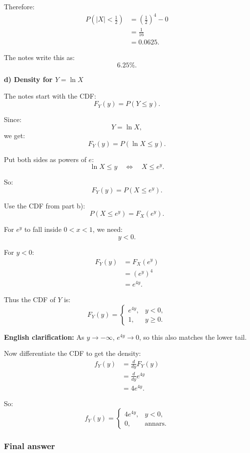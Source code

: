 \documentclass[10pt]{article}
\begin{document}
Therefore:
\begin{align*}
P(|X|<\tfrac12)
&=
\left(\frac12\right)^4-0
\\[2mm]
&=
\frac{1}{16}
\\[2mm]
&=
0.0625.
\end{align*}

The notes write this as:
\[
6.25\%.
\]

\textbf{d) Density for \(Y=\ln X\)}

The notes start with the CDF:
\[
F_Y(y)=P(Y\le y).
\]

Since:
\[
Y=\ln X,
\]
we get:
\[
F_Y(y)=P(\ln X\le y).
\]

Put both sides as powers of \(e\):
\[
\ln X\le y
\quad \Longleftrightarrow \quad
X\le e^y.
\]

So:
\[
F_Y(y)=P(X\le e^y).
\]

Use the CDF from part b):
\[
P(X\le e^y)=F_X(e^y).
\]

For \(e^y\) to fall inside \(0<x<1\), we need:
\[
y<0.
\]

For \(y<0\):
\begin{align*}
F_Y(y)
&=
F_X(e^y)
\\[2mm]
&=
(e^y)^4
\\[2mm]
&=
e^{4y}.
\end{align*}

Thus the CDF of \(Y\) is:
\[
F_Y(y)=
\begin{cases}
e^{4y},
& y<0,\\
1,
& y\ge 0.
\end{cases}
\]

\textbf{English clarification:}
As \(y\to -\infty\), \(e^{4y}\to 0\), so this also
matches the lower tail.

Now differentiate the CDF to get the density:
\begin{align*}
f_Y(y)
&=
\frac{d}{dy}F_Y(y)
\\[2mm]
&=
\frac{d}{dy}e^{4y}
\\[2mm]
&=
4e^{4y}.
\end{align*}

So:
\[
f_Y(y)=
\begin{cases}
4e^{4y},
& y<0,\\
0,
& \text{annars}.
\end{cases}
\]

\subsubsection*{Final answer}
\end{document}
